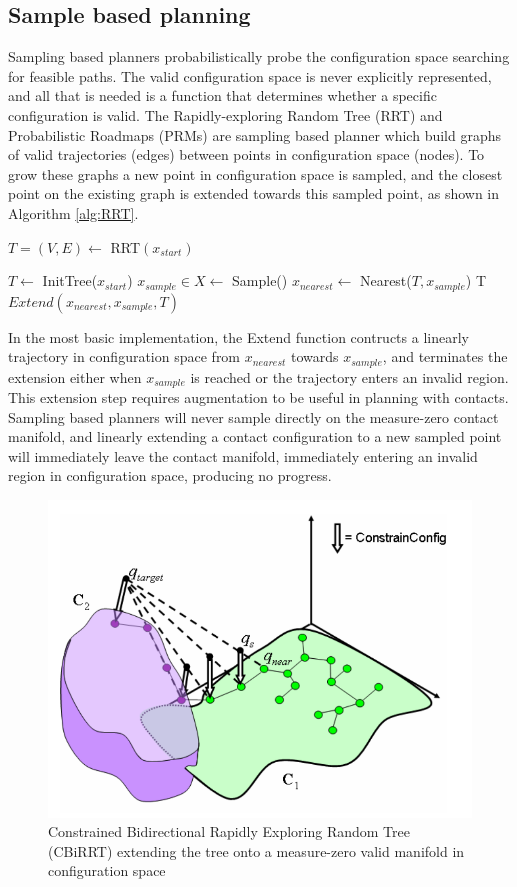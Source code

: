 \documentclass[../thesis.tex]{subfiles}
\begin{document}
\subsection{Sample based planning}
Sampling based planners probabilistically probe the configuration space searching for feasible paths.
The valid configuration space is never explicitly represented, and all that is needed is a function that determines whether a specific configuration is valid.
The Rapidly-exploring Random Tree (RRT) and Probabilistic Roadmaps (PRMs) are sampling based planner which build graphs of valid trajectories (edges) between points in configuration space (nodes).
To grow these graphs a new point in configuration space is sampled, and the closest point on the existing graph is extended towards this sampled point, as shown in Algorithm \ref{alg:RRT}. 
\cite{LaValle1998}

\begin{algorithm}
\caption{$T=(V,E) \leftarrow$ RRT$(x_{start})$}\label{alg:RRT}
\begin{algorithmic}[1]
\State $T \leftarrow$ InitTree($x_{start}$)
\State $x_{sample} \in X \leftarrow$ Sample()
\State $x_{nearest} \leftarrow $ Nearest($T, x_{sample}$)
\State T \leftarrow $Extend(x_{nearest}, x_{sample}, T)$
\EndWhile
\end{algorithmic}
\end{algorithm}

In the most basic implementation, the Extend function contructs a linearly trajectory in configuration space from $x_{nearest}$ towards $x_{sample}$, and terminates the extension either when $x_{sample}$ is reached or the trajectory enters an invalid region. \cite{LaValle1998}
This extension step requires augmentation to be useful in planning with contacts.
Sampling based planners will never sample directly on the measure-zero contact manifold, and linearly extending a contact configuration to a new sampled point will immediately leave the contact manifold, immediately entering an invalid region in configuration space, producing no progress.

\begin{figure}
  \centering
  \includegraphics[width=.5\linewidth]{./RelatedWork/CiBRRT.png}
  \caption{Constrained Bidirectional Rapidly Exploring Random Tree (CBiRRT) extending the tree onto a measure-zero valid manifold in configuration space}
  \label{fig:CiBRRT}
\end{figure}
\end{document}
